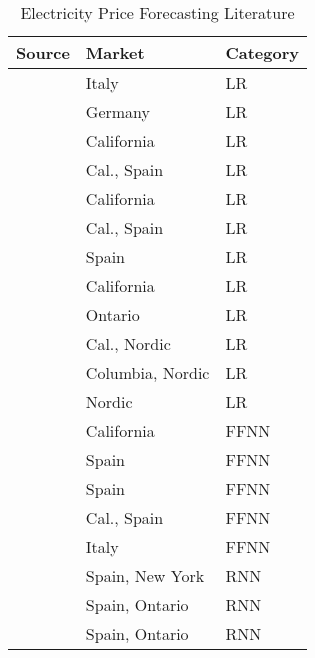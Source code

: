 \begin{table}[H]
	\begin{center}
			\begin{tabular}{l | l | l }
		 		Source & Market &  Category  \\
				\hline
				\cite{schmutz_electricity_2004} & Italy  &  LR\\
				\cite{crespo_cuaresma_forecasting_2004} & Germany  & LR \\
				\cite{weron_forecasting_2005} & California & LR \\
								\cite{contreras_arima_2003} & Cal., Spain & LR \\
				\cite{misiorek_point_2006} & California & LR\\
				\cite{nogales_forecasting_2002} & Cal., Spain & LR\\
				\cite{nogales_electricity_2006} & Spain & LR\\
				\cite{knittel_empirical_2005} & California &LR\\
				\cite{zareipour_application_2006} & Ontario &LR\\ 
				\cite{weron_forecasting_2008} & Cal., Nordic &LR\\ 
				\cite{lira_short-term_2009} & Columbia, Nordic &LR\\
				\cite{kristiansen_forecasting_2012} &  Nordic &LR\\ 
				\cite{yamin_adaptive_2004} &  California &FFNN\\
				\cite{gareta_forecasting_2006} &  Spain &FFNN \\
				\cite{cruz_effect_2011} &  Spain  & FFNN \\ 
				\cite{shafie-khah_price_2011} &  Cal., Spain & FFNN\\ 
				\cite{panapakidis_day-ahead_2016} &  Italy & FFNN\\ 
				\cite{anbazhagan_day-ahead_2013} &  Spain, New York & RNN \\ 
				\cite{mirikitani_nonlinear_2011} &  Spain, Ontario & RNN\\
				\cite{sharma_hybrid_2013} &  Spain, Ontario & RNN 
			\end{tabular}
	\end{center}
	\caption{Electricity Price Forecasting Literature}
	\label{tab:el_lit}
\end{table}
